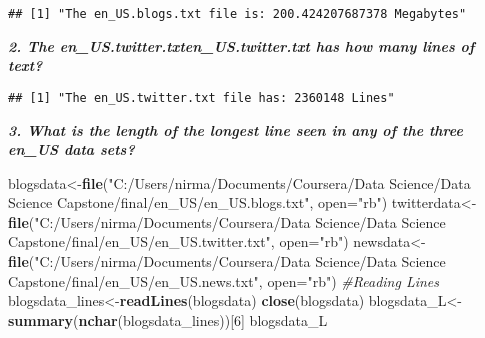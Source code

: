 \documentclass[
]{article}
\newenvironment{Shaded}{\begin{snugshade}}{\end{snugshade}}
\newcommand{\CommentTok}[1]{\textcolor[rgb]{0.56,0.35,0.01}{\textit{#1}}}
\newcommand{\ControlFlowTok}[1]{\textcolor[rgb]{0.13,0.29,0.53}{\textbf{#1}}}
\newcommand{\DataTypeTok}[1]{\textcolor[rgb]{0.13,0.29,0.53}{#1}}
\newcommand{\DecValTok}[1]{\textcolor[rgb]{0.00,0.00,0.81}{#1}}
\newcommand{\KeywordTok}[1]{\textcolor[rgb]{0.13,0.29,0.53}{\textbf{#1}}}
\newcommand{\NormalTok}[1]{#1}
\newcommand{\OperatorTok}[1]{\textcolor[rgb]{0.81,0.36,0.00}{\textbf{#1}}}
\newcommand{\StringTok}[1]{\textcolor[rgb]{0.31,0.60,0.02}{#1}}
\begin{document}
\begin{verbatim}
## [1] "The en_US.blogs.txt file is: 200.424207687378 Megabytes"
\end{verbatim}

\textbf{\emph{2. The en\_US.twitter.txt\textbar en\_US.twitter.txt has
how many lines of text?}}

\begin{Shaded}
\end{Shaded}

\begin{verbatim}
## [1] "The en_US.twitter.txt file has: 2360148 Lines"
\end{verbatim}

\textbf{\emph{3. What is the length of the longest line seen in any of
the three en\_US data sets? }}

\begin{Shaded}
\begin{Highlighting}[]
\NormalTok{blogsdata<-}\KeywordTok{file}\NormalTok{(}\StringTok{"C:/Users/nirma/Documents/Coursera/Data Science/Data Science Capstone/final/en_US/en_US.blogs.txt"}\NormalTok{, }\DataTypeTok{open=}\StringTok{"rb"}\NormalTok{)}
\NormalTok{twitterdata<-}\KeywordTok{file}\NormalTok{(}\StringTok{"C:/Users/nirma/Documents/Coursera/Data Science/Data Science Capstone/final/en_US/en_US.twitter.txt"}\NormalTok{, }\DataTypeTok{open=}\StringTok{"rb"}\NormalTok{)}
\NormalTok{newsdata<-}\KeywordTok{file}\NormalTok{(}\StringTok{"C:/Users/nirma/Documents/Coursera/Data Science/Data Science Capstone/final/en_US/en_US.news.txt"}\NormalTok{, }\DataTypeTok{open=}\StringTok{"rb"}\NormalTok{)}
\CommentTok{#Reading Lines}
\NormalTok{blogsdata_lines<-}\KeywordTok{readLines}\NormalTok{(blogsdata)}
\KeywordTok{close}\NormalTok{(blogsdata)}
\NormalTok{blogsdata_L<-}\KeywordTok{summary}\NormalTok{(}\KeywordTok{nchar}\NormalTok{(blogsdata_lines))[}\DecValTok{6}\NormalTok{]}
\NormalTok{blogsdata_L}
\end{Highlighting}
\end{Shaded}
\end{document}

